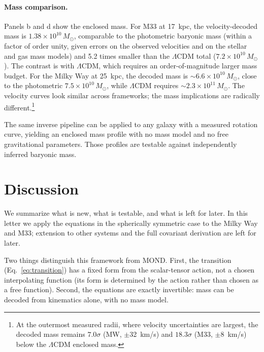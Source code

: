 \documentclass[aps,twocolumn,amsmath,amssymb,reprint,nofootinbib,nobalancelastpage]{revtex4-2}
\begin{document}
\paragraph{Mass comparison.}
Panels b and d show the enclosed mass. For M33 at 17~kpc, the velocity-decoded mass is $1.38\times10^{10}\,M_\odot$, comparable to the photometric baryonic mass (within a factor of order unity, given errors on the observed velocities and on the stellar and gas mass models) and 5.2 times smaller than the $\Lambda$CDM total ($7.2\times10^{10}\,M_\odot$). The contrast is with $\Lambda$CDM, which requires an order-of-magnitude larger mass budget. For the Milky Way at 25~kpc, the decoded mass is $\sim 6.6\times10^{10}\,M_\odot$, close to the photometric $7.5\times10^{10}\,M_\odot$, while $\Lambda$CDM requires $\sim 2.3\times10^{11}\,M_\odot$. The velocity curves look similar across frameworks; the mass implications are radically different.\footnote{At the outermost measured radii, where velocity uncertainties are largest, the decoded mass remains $7.0\sigma$ (MW, $\pm$32~km/s) and $18.3\sigma$ (M33, $\pm$8~km/s) below the $\Lambda$CDM enclosed mass.}

The same inverse pipeline can be applied to any galaxy with a measured rotation curve, yielding an enclosed mass profile with no mass model and no free gravitational parameters. Those profiles are testable against independently inferred baryonic mass.

\section{Discussion}
\label{sec:discussion}

We summarize what is new, what is testable, and what is left for later. In this letter we apply the equations in the spherically symmetric case to the Milky Way and M33; extension to other systems and the full covariant derivation are left for later.

Two things distinguish this framework from MOND. First, the transition (Eq.~\ref{eq:transition}) has a fixed form from the scalar-tensor action, not a chosen interpolating function (its form is determined by the action rather than chosen as a free function). Second, the equations are exactly invertible: mass can be decoded from kinematics alone, with no mass model.
\end{document}

